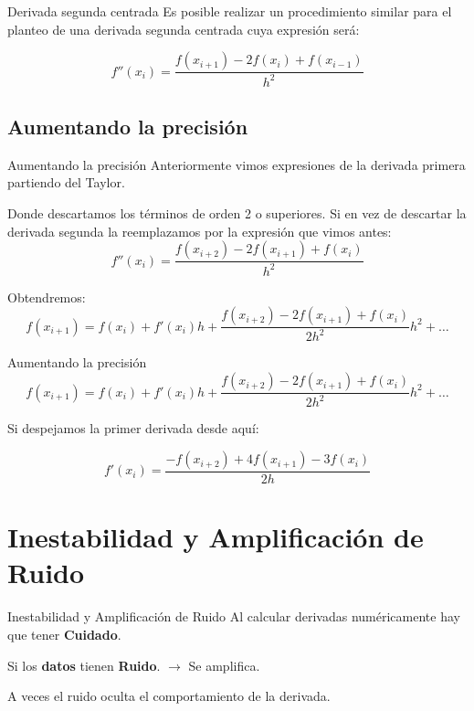 \documentclass[xcolor=svgnames]{beamer} %
\theoremstyle{plain}
\renewcommand{\textbf}[1]{{\bfseries\textcolor{redUnq2}{#1}}}
\theoremstyle{definition}
\begin{document}
\begin{frame}{Derivada segunda centrada}
Es posible realizar un procedimiento similar para el planteo de una derivada segunda centrada cuya expresión será:\vspace{20pt}

\begin{tcolorbox}
  $$ f''(x_i) = \frac{f(x_{i+1}) -2f(x_{i})+f(x_{i-1})}{h^2}$$

\end{tcolorbox}
\end{frame}


\subsection{Aumentando la precisión}

\begin{frame}{Aumentando la precisión}
	Anteriormente vimos expresiones de la derivada primera partiendo del Taylor.\pause
	
 Donde descartamos los términos de orden 2 o superiores. Si en vez de descartar la derivada segunda la reemplazamos por la expresión que vimos antes:
  $$ f''(x_i) = \frac{f(x_{i+2}) -2f(x_{i+1})+f(x_{i})}{h^2}$$
 
  Obtendremos:
  $$f(x_{i+1}) = f(x_i) + f'(x_i) h + \frac{f(x_{i+2}) -2f(x_{i+1})+f(x_{i})}{2h^2} h^2 + \dots $$
  
  	 
\end{frame}


\begin{frame}{Aumentando la precisión}
  $$f(x_{i+1}) = f(x_i) + f'(x_i) h + \frac{f(x_{i+2}) -2f(x_{i+1})+f(x_{i})}{2h^2} h^2 + \dots $$
  
  Si despejamos la primer derivada desde aquí:\vspace{15pt} \pause
  \begin{tcolorbox}  
  
  $$ f'(x_i) = \frac{-f(x_{i+2}) +4f(x_{i+1})-3f(x_{i})}{2h} $$
  \end{tcolorbox}  
  
  
\end{frame}


\section{Inestabilidad y Amplificación de Ruido}

\begin{frame}{Inestabilidad y Amplificación de Ruido}
  Al calcular derivadas numéricamente hay que tener \textbf{Cuidado}.\vspace{15pt} \pause
  
  Si los \textbf{datos} tienen \textbf{Ruido}. \pause $\rightarrow$ Se amplifica.\vspace{15pt} \pause
  
  A veces el ruido oculta el comportamiento de la derivada.
  
\end{frame}
\end{document}
